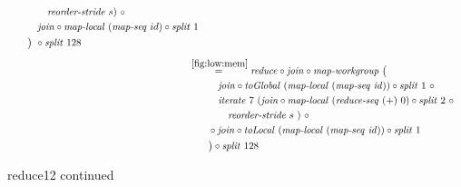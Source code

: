\begin{figure*}[t]
\begin{align*}
\begin{aligned}
    &\qquad\qquad \reorderStride\ s)\ \circ\\
    &\qquad\quad\join \circ \mapLocal\ (\mapSeq\ id) \circ \splitN\ 1\\
    &\qquad\big)\ \circ \splitN\ 128
  \end{aligned}\\[.5em]
%
  &\hspace{-2em}\quad\begin{aligned}
    &\overset{\ref{fig:low:mem}}{=\hspace{.2em}}
      \reduce \circ \join \circ \mapWorkgroup\ \big(\\
    &\qquad\quad \join \circ \toGlobal\ (\mapLocal\ (\mapSeq\ \id)) \circ \splitN\ 1\ \circ\\
    &\qquad\quad \iterateN\ 7\ (\join \circ \mapLocal\ (\reduceSeq\ (+)\ 0) \circ \splitN\ 2\ \circ\\
    &\qquad\qquad \reorderStride\ s\ )\ \circ\\
    &\qquad \circ \join \circ \toLocal\ (\mapLocal\ (\mapSeq\ \id)) \circ \splitN\ 1\\
    &\qquad\big) \circ \splitN\ 128
  \end{aligned}
%  
\end{align*}
\caption{reduce12 continued}
\end{figure*}

